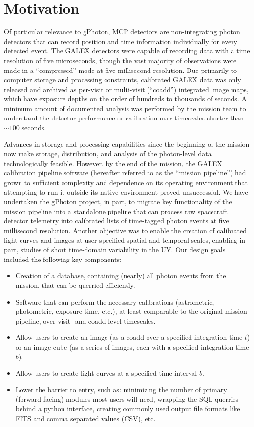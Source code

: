\documentclass[5p]{elsarticle}
\begin{document}
\section{Motivation}
\label{motivation}
Of particular relevance to gPhoton, MCP detectors are non-integrating photon detectors that can record position and time information individually for every detected event.  The GALEX detectors were capable of recording data with a time resolution of five microseconds, though the vast majority of observations were made in a ``compressed'' mode at five millisecond resolution. Due primarily to computer storage and processing constraints, calibrated GALEX data was only released and archived as per-visit or multi-visit (``coadd'') integrated image maps, which have exposure depths on the order of hundreds to thousands of seconds. A minimum amount of documented analysis was performed by the mission team to understand the detector performance or calibration over timescales shorter than $\sim 100$ seconds.

Advances in storage and processing capabilities since the beginning of the mission now make storage, distribution, and analysis of the photon-level data technologically feasible. However, by the end of the mission, the GALEX calibration pipeline software (hereafter referred to as the ``mission pipeline'') had grown to sufficient complexity and dependence on its operating environment that attempting to run it outside its native environment proved unsuccessful.  We have undertaken the gPhoton project, in part, to migrate key functionality of the mission pipeline into a standalone pipeline that can process raw spacecraft detector telemetry into calibrated lists of time-tagged photon events at five millisecond resolution. Another objective was to enable the creation of calibrated light curves and images at user-specified spatial and temporal scales, enabling in part, studies of short time-domain variability in the UV.  Our design goals included the following key components:
\begin{itemize}
\item{Creation of a database, containing (nearly) all photon events from the mission, that can be querried efficiently.}
\item{Software that can perform the necessary calibrations (astrometric, photometric, exposure time, etc.), at least comparable to the original mission pipeline, over visit- and coadd-level timescales.}
\item{Allow users to create an image (as a coadd over a specified integration time $t$) or an image cube (as a series of images, each with a specified integration time $b$).}
\item{Allow users to create light curves at a specified time interval $b$.}
\item{Lower the barrier to entry, such as: minimizing the number of primary (forward-facing) modules most users will need, wrapping the SQL querries behind a python interface, creating commonly used output file formats like FITS and comma separated values (CSV), etc.}
\end{itemize}
\end{document}

